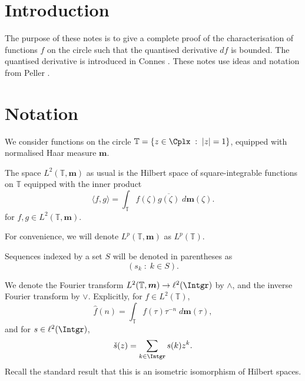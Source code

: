 \documentclass{unswmaths}
\begin{document}
\subject{}
\author{}
\title{}
\studentno{}


\newcommand{\Real}{\operatorname{Re}}
\newcommand{\Img}{\operatorname{Im}}
\newcommand{\lan}{\langle}
\newcommand{\ran}{\rangle}
\newcommand{\Proj}{\mathbb{P}}
\newcommand{\isom}{\cong}
\newcommand{\id}{{\operatorname{id}}}
\newcommand{\ha}{\boldsymbol{m}}
\newcommand{\Circ}{\mathbb{T}}
\newcommand{\BMO}{{BMO}}
\newcommand{\sgn}{\operatorname{sgn}}
\newcommand{\Diff}{\mathcal{D}}
\newcommand{\pvint}{\mathrm{p.v.}\int}

\section*{Introduction}
The purpose of these notes is to give a complete proof of the characterisation of functions
$f$ on the circle such that the quantised derivative $df$ is bounded. The quantised derivative
is introduced in Connes \cite{connes94}. These notes use ideas and notation from Peller \cite{peller}.

\section*{Notation} 
We consider functions on the circle $\Circ = \{z \in \Cplx\;:\;|z| = 1\}$, equipped
with normalised Haar measure $\ha$.

The space $L^2(\Circ,\ha)$ as usual is the Hilbert space of square-integrable functions
on $\Circ$ equipped with the inner product
\begin{equation*}
    \langle f,g\rangle = \int_{\Circ} f(\zeta)\overline{g(\zeta)}\;d\ha(\zeta).
\end{equation*}
for $f,g \in L^2(\Circ, \ha)$.

For convenience, we will denote $L^p(\Circ,\ha)$ as $L^p(\Circ)$.


Sequences indexed by a set $S$ will be denoted in parentheses as
\begin{equation*}
    (s_k\;:\;k \in S).
\end{equation*}

We denote the Fourier transform $L^2(\Circ,\ha) \rightarrow \ell^2(\Intgr)$ 
by $\wedge$, and the inverse Fourier transform by $\vee$. Explicitly,
for $f \in L^2(\Circ)$, 
\begin{equation*}
    \hat{f}(n) = \int_{\Circ} f(\tau)\tau^{-n}\;d\ha(\tau),
\end{equation*}
and for $s \in \ell^2(\Intgr)$,
\begin{equation*}
    \check{s}(z) = \sum_{k \in \Intgr} s(k)z^k.
\end{equation*}
Recall the standard result that this is an isometric isomorphism of Hilbert spaces.
\end{document}
